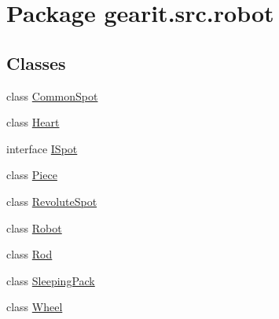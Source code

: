 \hypertarget{namespacegearit_1_1src_1_1robot}{\section{Package gearit.\+src.\+robot}
\label{namespacegearit_1_1src_1_1robot}
}
\subsection*{Classes}
\begin{DoxyCompactItemize}
\item 
class \hyperlink{classgearit_1_1src_1_1robot_1_1_common_spot}{Common\+Spot}
\item 
class \hyperlink{classgearit_1_1src_1_1robot_1_1_heart}{Heart}
\item 
interface \hyperlink{interfacegearit_1_1src_1_1robot_1_1_i_spot}{I\+Spot}
\item 
class \hyperlink{classgearit_1_1src_1_1robot_1_1_piece}{Piece}
\item 
class \hyperlink{classgearit_1_1src_1_1robot_1_1_revolute_spot}{Revolute\+Spot}
\item 
class \hyperlink{classgearit_1_1src_1_1robot_1_1_robot}{Robot}
\item 
class \hyperlink{classgearit_1_1src_1_1robot_1_1_rod}{Rod}
\item 
class \hyperlink{classgearit_1_1src_1_1robot_1_1_sleeping_pack}{Sleeping\+Pack}
\item 
class \hyperlink{classgearit_1_1src_1_1robot_1_1_wheel}{Wheel}
\end{DoxyCompactItemize}
